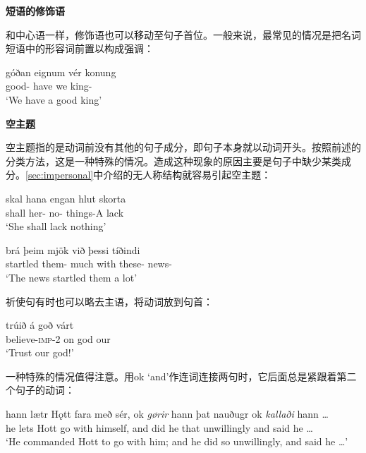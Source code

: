 \textbf{短语的修饰语}

和中心语一样，修饰语也可以移动至句子首位。一般来说，最常见的情况是把名词短语中的形容词前置以构成强调：
\begin{exe}
    \ex \gll
    góðan	eignum	vér	konung\\
    good-{\acc}	have	we	king-{\acc}\\
    \trans `We have a good king’

\end{exe}

\textbf{空主题}

空主题指的是动词前没有其他的句子成分，即句子本身就以动词开头。按照前述的分类方法，这是一种特殊的情况。造成这种现象的原因主要是句子中缺少某类成分。\ref{sec:impersonal}中介绍的无人称结构就容易引起空主题：
\begin{exe}
    \ex \gll
    skal	hana	engan	hlut	skorta\\
    shall	her-{\acc}	no-{\acc}	things-A	lack\\
    \trans `She shall lack nothing’

    \ex \gll
    brá	þeim	mjök	við	þessi	tíðindi\\
    startled	them-{\dat}	much	with	these-{\acc}	news-{\acc}\\
    \trans `The news startled them a lot’
\end{exe}

祈使句有时也可以略去主语，将动词放到句首：
\begin{exe}
    \ex \gll
    trúið	á	goð	várt\\
    believe-\textsc{imp}-{\footnotesize 2}{\pl}	on	god	our\\
    \trans `Trust our god!’
\end{exe}

一种特殊的情况值得注意。用ok `and‌’作连词连接两句时，它后面总是紧跟着第二个句子的动词：
\begin{exe}
    \ex \gll
    hann	lætr	Hǫtt	fara	með	sér,	ok	\textit{gørir}	hann þat	nauðugr	ok	\textit{kallaði}	hann	…	\\	he	lets	Hott	go	with	himself,	and	did	he
    that	unwillingly	and	said	he	…\\
    \trans `He commanded Hott to go with him; and he did so unwillingly, and said he …‌’
\end{exe}







